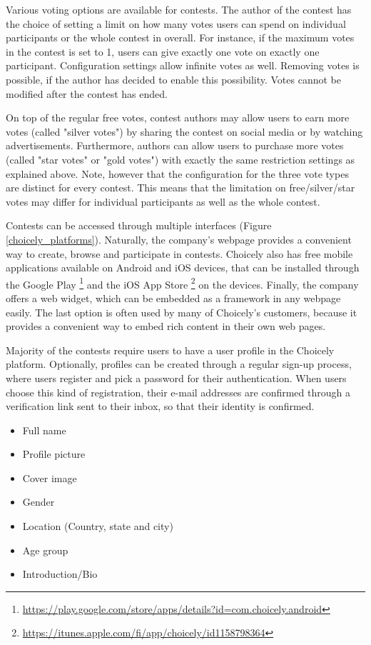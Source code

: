     Various voting options are available for contests. The author of the contest has the choice of setting a limit on how many votes users can spend on individual participants or the whole contest in overall. For instance, if the maximum votes in the contest is set to 1, users can give exactly one vote on exactly one participant. Configuration settings allow infinite votes as well. Removing votes is possible, if the author has decided to enable this possibility. Votes cannot be modified after the contest has ended.
    
    On top of the regular free votes, contest authors may allow users to earn more votes (called "silver votes") by sharing the contest on social media or by watching advertisements. Furthermore, authors can allow users to purchase more votes (called "star votes" or "gold votes") with exactly the same restriction settings as explained above. Note, however that the configuration for the three vote types are distinct for every contest. This means that the limitation on free/silver/star votes may differ for individual participants as well as the whole contest. 

    Contests can be accessed through multiple interfaces (Figure \ref{choicely_platforms}). Naturally, the company's webpage provides a convenient way to create, browse and participate in contests. Choicely also has free mobile applications available on Android and iOS devices, that can be installed through the Google Play \footnote{\url{https://play.google.com/store/apps/details?id=com.choicely.android}} and the iOS App Store \footnote{\url{https://itunes.apple.com/fi/app/choicely/id1158798364}} on the devices. Finally, the company offers a web widget, which can be embedded as a framework in any webpage easily. The last option is often used by many of Choicely's customers, because it provides a convenient way to embed rich content in their own web pages.
    
    Majority of the contests require users to have a user profile in the Choicely platform. Optionally, profiles can be created through a regular sign-up process, where users register and pick a password for their authentication. When users choose this kind of registration, their e-mail addresses are confirmed through a verification link sent to their inbox, so that their identity is confirmed.      

    \begin{itemize}
        \item Full name
        \item Profile picture
        \item Cover image
        \item Gender
        \item Location (Country, state and city)
        \item Age group
        \item Introduction/Bio
    \end{itemize}

